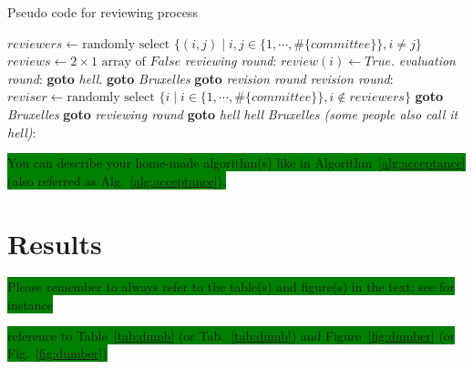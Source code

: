 \documentclass[12pt,a4paper]{article}
\begin{document}
\begin{small}
\begin{algorithm}[htbp]
\caption{Pseudo code for reviewing process}\label{alg:acceptance}
\begin{algorithmic}[1]
\State $\textit{reviewers} \gets \text{randomly select } \{(i,j) \mid i,j \in  \{1, \cdots, \#\{\textit{committee}\}\}, i \neq j \}$
\State $\textit{reviews} \gets 2 \times 1 \text{ array of } \textit{False}$
\BState \emph{reviewing round}:
\State $\textit{review}(i) \gets \textit{True}$.
\Else {}
\EndIf
\EndFor
\BState \emph{evaluation round}:
\State \textbf{goto} \emph{hell}.
\State \textbf{goto} \emph{Bruxelles}
\Else \textbf{ goto} \emph{revision round}
\EndIf
\BState \emph{revision round}:
\State $\textit{reviser} \gets \text{randomly select } \{i \mid i \in  \{1, \cdots, \#\{\textit{committee}\}\}, i \not\in \textit{reviewers} \}$
\State \textbf{ goto} \emph{Bruxelles}
\State \textbf{ goto} \emph{reviewing round}
\Else \textbf{ goto} \emph{hell}
\EndIf
\BState \emph{hell} 
\State {}
\BState \emph{Bruxelles (some people also call it hell)}:
\State {}
\EndProcedure
\end{algorithmic}
\end{algorithm}
\end{small}

\colorbox{green}{
You can describe your home-made algorithm(s) like in Algorithm~\ref{alg:acceptance} (also referred as Alg.~\ref{alg:acceptance}).
}


\section{Results}

\colorbox{green}{Please remember to always refer to the table(s) and figure(s) in the text; see for instance}

\colorbox{green}{reference to Table~\ref{tab:dumb} (or Tab.~\ref{tab:dumb}) and Figure~\ref{fig:dumber} (or Fig.~\ref{fig:dumber})}
\end{document}
